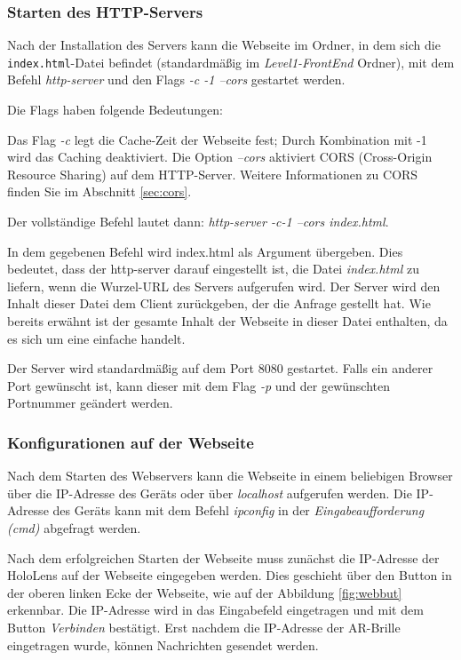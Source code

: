 \begin{itemize}
\subsubsection*{Starten des HTTP-Servers}
Nach der Installation des Servers kann die Webseite im Ordner, in dem sich die \texttt{index.html}-Datei befindet (standardmäßig im \textit{Level1-FrontEnd} Ordner), mit dem Befehl \textit{http-server} und den Flags \textit{-c -1 --cors} gestartet werden.

Die Flags haben folgende Bedeutungen:

Das Flag \textit{-c} legt die Cache-Zeit der Webseite fest; Durch Kombination mit -1 wird das Caching deaktiviert. Die Option \textit{--cors} aktiviert CORS (Cross-Origin Resource Sharing) auf dem HTTP-Server. Weitere
Informationen zu CORS finden Sie im Abschnitt \ref{sec:cors}.

Der vollständige Befehl lautet dann: \textit{http-server -c-1 --cors index.html}.

In dem gegebenen Befehl wird index.html als Argument übergeben. Dies bedeutet, dass der http-server darauf eingestellt ist, die Datei \textit{index.html} zu liefern, wenn die Wurzel-URL des Servers aufgerufen wird. Der Server wird den Inhalt dieser Datei dem Client zurückgeben, der die Anfrage gestellt hat. Wie bereits erwähnt ist der gesamte Inhalt der Webseite in dieser Datei enthalten, da es sich um eine einfache  handelt.

Der Server wird standardmäßig auf dem Port 8080 gestartet. Falls ein anderer Port gewünscht ist, kann dieser mit dem Flag \textit{-p} und der gewünschten Portnummer geändert werden.

\subsubsection*{Konfigurationen auf der Webseite}
Nach dem Starten des Webservers kann die Webseite in einem beliebigen Browser über die IP-Adresse des Geräts oder über \textit{localhost} aufgerufen werden. Die IP-Adresse des Geräts kann mit dem Befehl \textit{ipconfig} in der \textit{Eingabeaufforderung (cmd)} abgefragt werden.

Nach dem erfolgreichen Starten der Webseite muss zunächst die IP-Adresse der HoloLens auf der Webseite eingegeben werden. Dies geschieht über den Button in der oberen linken Ecke der Webseite, wie auf der Abbildung \ref{fig:webbut} erkennbar. Die IP-Adresse wird in das Eingabefeld eingetragen und mit dem Button \textit{Verbinden} bestätigt. Erst nachdem die IP-Adresse der AR-Brille eingetragen wurde, können Nachrichten gesendet werden.


\end{itemize}
